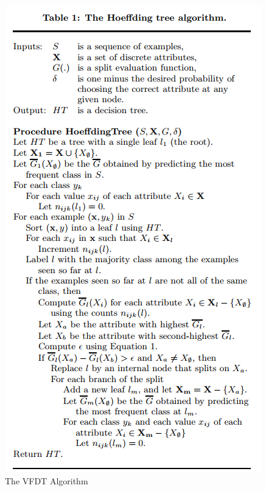 \documentclass[sigplan]{acmart}\settopmatter{printfolios=true,printccs=false,printacmref=false}
\begin{document}
\begin{figure}
	\includegraphics[width=\linewidth]{figs/vfdt.PNG}
	\caption{The VFDT Algorithm \cite{domingos2000mining}}
	\label{fig:vfdt}
\end{figure}
\end{document}
